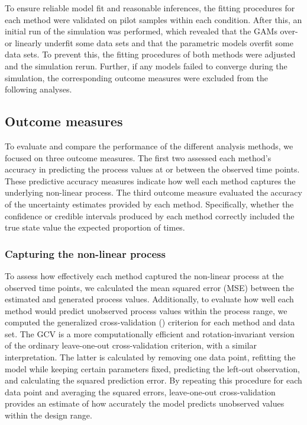 \documentclass[man, floatsintext]{apa7}
\begin{document}
To ensure reliable model fit and reasonable inferences, the fitting procedures
for each method were validated on pilot samples within each condition. After
this, an initial run of the simulation was performed, which revealed
that the GAMs over- or linearly underfit some data sets and that the parametric
models overfit some data sets. To prevent this, the fitting procedures of
both methods were adjusted and the simulation rerun. Further, if any
models failed to converge during the simulation, the corresponding outcome
measures were excluded from the following analyses.

\subsection{Outcome measures}

To evaluate and compare the performance of the different analysis methods, we
focused on three outcome measures. The first two assessed each method's
accuracy in predicting the process values at or between the observed time
points. These predictive accuracy measures indicate how well each method
captures the underlying non-linear process. The third outcome measure evaluated
the accuracy of the uncertainty estimates provided by each method.
Specifically, whether the confidence or credible intervals produced
by each method correctly included the true state value the expected proportion
of times.

\subsubsection{Capturing the non-linear process}

To assess how effectively each method captured the non-linear process at the
observed time points, we calculated the mean squared error (MSE) between the
estimated and generated process values. Additionally,
to evaluate how well each method
would predict unobserved process values within the process range, we computed
the generalized cross-validation (\parencite[GCV;][]{golub_generalized_1979})
criterion
for each method and data set. The GCV is a more computationally efficient and
rotation-invariant version of the ordinary leave-one-out cross-validation
criterion, with a similar interpretation. The latter is calculated by removing
one data point, refitting the
model while keeping certain parameters fixed, predicting the left-out
observation, and calculating the squared
prediction error. By repeating this procedure for each data point and averaging
the squared errors, leave-one-out cross-validation provides an estimate of
how accurately the model
predicts unobserved values within the design range.
\end{document}
